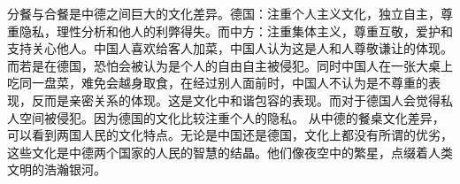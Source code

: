 分餐与合餐是中德之间巨大的文化差异。德国：注重个人主义文化，独立自主，尊重隐私，理性分析和他人的利弊得失。而中方：注重集体主义，尊重互敬，爱护和支持关心他人。中国人喜欢给客人加菜，中国人认为这是人和人尊敬谦让的体现。而若是在德国，恐怕会被认为是个人的自由自主被侵犯。同时中国人在一张大桌上吃同一盘菜，难免会越身取食，在经过别人面前时，中国人不认为是不尊重的表现，反而是亲密关系的体现。这是文化中和谐包容的表现。而对于德国人会觉得私人空间被侵犯。因为德国的文化比较注重个人的隐私。
从中德的餐桌文化差异，可以看到两国人民的文化特点。无论是中国还是德国，文化上都没有所谓的优劣，这些文化是中德两个国家的人民的智慧的结晶。他们像夜空中的繁星，点缀着人类文明的浩瀚银河。
